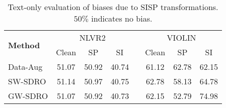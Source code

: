 \begin{table}
    \centering
    \begin{tabular}{@{}l ccc c ccc@{}}
        \toprule
        \multirow{2}{*}{\textbf{Method}} & \multicolumn{3}{c}{NLVR2} & \hphantom & \multicolumn{3}{c}{VIOLIN} \\ 
         \cmidrule{2-4} \cmidrule{6-8}
         & Clean & SP & SI && Clean & SP & SI \\
         \midrule 
        Data-Aug & 51.07 & 50.92 & 40.74 && 61.12 & 62.78 & 62.15 \\
        SW-SDRO  & 51.14 & 50.97 & 40.75 && 62.78 & 58.13 & 64.78 \\
        GW-SDRO  & 51.07 & 50.92 & 40.73 && 62.15 & 52.79 & 74.98 \\
        \bottomrule
    \end{tabular}
    \caption{Text-only evaluation of biases due to SISP transformations. $50\%$ indicates no bias.}
    \label{tab:eval_textonly_bias}
\end{table}